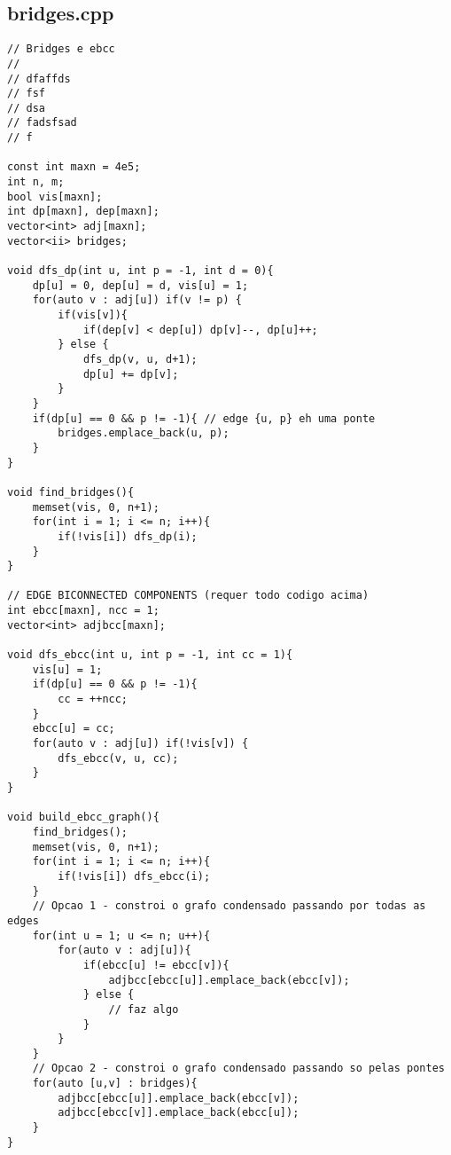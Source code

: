 \documentclass[11pt, a4paper, twoside]{article}
\begin{document}
\subsection{bridges.cpp}
\begin{lstlisting}
// Bridges e ebcc
//
// dfaffds
// fsf
// dsa
// fadsfsad
// f

const int maxn = 4e5;
int n, m;
bool vis[maxn];
int dp[maxn], dep[maxn];
vector<int> adj[maxn];
vector<ii> bridges;

void dfs_dp(int u, int p = -1, int d = 0){
    dp[u] = 0, dep[u] = d, vis[u] = 1;
    for(auto v : adj[u]) if(v != p) {
        if(vis[v]){
            if(dep[v] < dep[u]) dp[v]--, dp[u]++;
        } else {
            dfs_dp(v, u, d+1);
            dp[u] += dp[v];
        }
    }
    if(dp[u] == 0 && p != -1){ // edge {u, p} eh uma ponte
        bridges.emplace_back(u, p);
    }
}

void find_bridges(){
    memset(vis, 0, n+1);
    for(int i = 1; i <= n; i++){
        if(!vis[i]) dfs_dp(i);
    }
}

// EDGE BICONNECTED COMPONENTS (requer todo codigo acima)
int ebcc[maxn], ncc = 1;
vector<int> adjbcc[maxn];

void dfs_ebcc(int u, int p = -1, int cc = 1){
    vis[u] = 1;
    if(dp[u] == 0 && p != -1){
        cc = ++ncc;
    }
    ebcc[u] = cc;
    for(auto v : adj[u]) if(!vis[v]) {
        dfs_ebcc(v, u, cc);
    }
}

void build_ebcc_graph(){
    find_bridges();
    memset(vis, 0, n+1);
    for(int i = 1; i <= n; i++){
        if(!vis[i]) dfs_ebcc(i);
    }
    // Opcao 1 - constroi o grafo condensado passando por todas as edges
    for(int u = 1; u <= n; u++){
        for(auto v : adj[u]){
            if(ebcc[u] != ebcc[v]){
                adjbcc[ebcc[u]].emplace_back(ebcc[v]);
            } else {
                // faz algo
            }
        }
    }
    // Opcao 2 - constroi o grafo condensado passando so pelas pontes
    for(auto [u,v] : bridges){
        adjbcc[ebcc[u]].emplace_back(ebcc[v]);
        adjbcc[ebcc[v]].emplace_back(ebcc[u]);
    }
}
\end{lstlisting}
\end{document}
